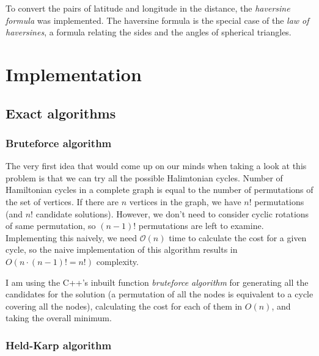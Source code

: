 \documentclass[12pt,twoside,notitlepage]{report}
\begin{document}
To convert the pairs of latitude and longitude in the distance, the {\it haversine formula} was implemented. The haversine formula is the special case of the {\it law of haversines}, a formula relating the sides and the angles of spherical triangles.

\cleardoublepage
\chapter{Implementation}



\section{Exact algorithms}

\subsection{Bruteforce algorithm}

The very first idea that would come up on our minds when taking a look at this problem is that we can try all the possible Halimtonian cycles. Number of Hamiltonian cycles in a complete graph is equal to the number of permutations of the set of vertices. If there are $n$ vertices in the graph, we have $n!$ permutations (and $n!$ candidate solutions). However, we don't need to consider cyclic rotations of same permutation, so $(n - 1)!$ permutations are left to examine. Implementing this naively, we need $ \mathcal{O}(n) $ time to calculate the cost for a given cycle, so the naive implementation of this algorithm results in $ O(n \cdot (n - 1)! = n!) $ complexity.

I am using the C++'s inbuilt function {\it bruteforce algorithm} for generating all the candidates for the solution (a permutation of all the nodes is equivalent to a cycle covering all the nodes), calculating the cost for each of them in $ O(n) $, and taking the overall minimum.

\subsection{Held-Karp algorithm} %
\end{document}
